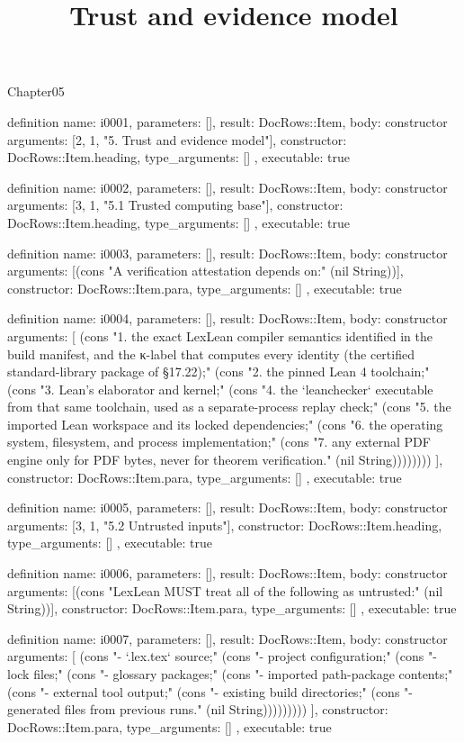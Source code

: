 \begin{lexlean}{Chapter05}
\title{Trust and evidence model}
\begin{semanticmodule}
definition{
  name: i0001,
  parameters: [],
  result: DocRows::Item,
  body: constructor{
    arguments: [2, 1, "5. Trust and evidence model"],
    constructor: DocRows::Item.heading,
    type_arguments: []
  },
  executable: true
}

definition{
  name: i0002,
  parameters: [],
  result: DocRows::Item,
  body: constructor{
    arguments: [3, 1, "5.1 Trusted computing base"],
    constructor: DocRows::Item.heading,
    type_arguments: []
  },
  executable: true
}

definition{
  name: i0003,
  parameters: [],
  result: DocRows::Item,
  body: constructor{
    arguments: [(cons "A verification attestation depends on:" (nil String))],
    constructor: DocRows::Item.para,
    type_arguments: []
  },
  executable: true
}

definition{
  name: i0004,
  parameters: [],
  result: DocRows::Item,
  body: constructor{
    arguments: [
      (cons "1. the exact LexLean compiler semantics identified in the build manifest, and the κ-label that computes every identity (the certified standard-library package of §17.22);" (cons "2. the pinned Lean 4 toolchain;" (cons "3. Lean's elaborator and kernel;" (cons "4. the `leanchecker` executable from that same toolchain, used as a separate-process replay check;" (cons "5. the imported Lean workspace and its locked dependencies;" (cons "6. the operating system, filesystem, and process implementation;" (cons "7. any external PDF engine only for PDF bytes, never for theorem verification." (nil String))))))))
    ],
    constructor: DocRows::Item.para,
    type_arguments: []
  },
  executable: true
}

definition{
  name: i0005,
  parameters: [],
  result: DocRows::Item,
  body: constructor{
    arguments: [3, 1, "5.2 Untrusted inputs"],
    constructor: DocRows::Item.heading,
    type_arguments: []
  },
  executable: true
}

definition{
  name: i0006,
  parameters: [],
  result: DocRows::Item,
  body: constructor{
    arguments: [(cons "LexLean MUST treat all of the following as untrusted:" (nil String))],
    constructor: DocRows::Item.para,
    type_arguments: []
  },
  executable: true
}

definition{
  name: i0007,
  parameters: [],
  result: DocRows::Item,
  body: constructor{
    arguments: [
      (cons "- `.lex.tex` source;" (cons "- project configuration;" (cons "- lock files;" (cons "- glossary packages;" (cons "- imported path-package contents;" (cons "- external tool output;" (cons "- existing build directories;" (cons "- generated files from previous runs." (nil String)))))))))
    ],
    constructor: DocRows::Item.para,
    type_arguments: []
  },
  executable: true
}


\end{semanticmodule}
\end{lexlean}
